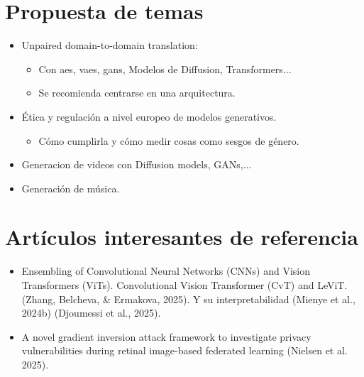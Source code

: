 \documentclass[a4paper]{article}
\begin{document}
\section*{Propuesta de temas}

\begin{itemize}
    \item Unpaired domain-to-domain translation:
    \begin{itemize}
        \item Con \glspl{ae}, \glspl{vae}, \glspl{gan}, Modelos de Diffusion, Transformers...
        \item Se recomienda centrarse en una arquitectura.
    \end{itemize}

    \item Ética y regulación a nivel europeo de modelos generativos.
    \begin{itemize}
        \item Cómo cumplirla y cómo medir cosas como sesgos de género.
    \end{itemize}

    \item Generacion de videos con Diffusion models, GANs,...

    \item Generación de música.
    
\end{itemize}

\section*{Artículos interesantes de referencia}

\begin{itemize}
    \item Ensembling of Convolutional Neural Networks (CNNs) and Vision Transformers (ViTs). Convolutional Vision Transformer (CvT) and LeViT. (Zhang, Belcheva, \& Ermakova, 2025). Y su interpretabilidad (Mienye et al., 2024b) (Djoumessi et al., 2025).

    \item A novel gradient inversion attack framework to investigate privacy vulnerabilities during retinal image-based federated learning (Nielsen et al. 2025).

\end{itemize}
\end{document}
